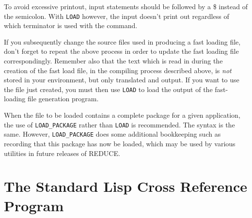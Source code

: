To avoid excessive printout, input statements should be followed by a \$
instead of the semicolon.  With {\tt LOAD} however, the input doesn't
print out regardless of which terminator is used with the command.

If you subsequently change the source files used in producing a fast
loading file, don't forget to repeat the above process in order to update
the fast loading file correspondingly.  Remember also that the text which
is read in during the creation of the fast load file, in the compiling
process described above, is {\em not} stored in your {\REDUCE}
environment, but only translated and output.  If you want to use the file
just created, you must then use {\tt LOAD} to load the output of the
fast-loading file generation program.

When the file to be loaded contains a complete package for a given
application, the use of {\tt LOAD\_PACKAGE} 
rather than {\tt LOAD} is
recommended.  The syntax is the same.  However, {\tt LOAD\_PACKAGE} does some
additional bookkeeping such as recording that this package has now be loaded,
which may be used by various utilities in future releases of REDUCE.

\section{The Standard Lisp Cross Reference Program} 

